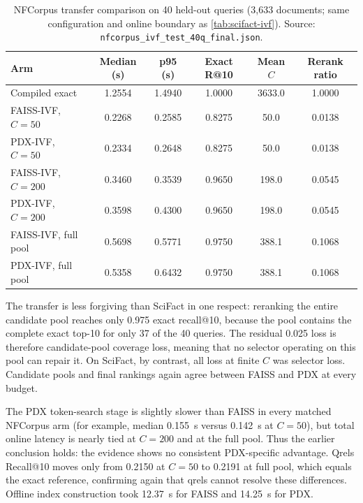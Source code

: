 \begin{table}[tb]
  \centering
  \caption{NFCorpus transfer comparison on 40 held-out queries
    (3{,}633 documents; same configuration and online boundary as
    \cref{tab:scifact-ivf}).
    Source: \texttt{nfcorpus\_ivf\_test\_40q\_final.json}.}
  \label{tab:nfcorpus-ivf}
  \footnotesize
  \begin{tabular}{@{}l S[table-format=1.4] S[table-format=1.4] S[table-format=1.4] S[table-format=4.1] S[table-format=1.4]@{}}
    \toprule
    Arm & {Median (\si{\second})} & {p95 (\si{\second})} & {Exact R@10} & {Mean $C$} & {Rerank ratio} \\
    \midrule
    Compiled exact      & 1.2554 & 1.4940 & 1.0000 & 3633.0 & 1.0000 \\
    \midrule
    FAISS-IVF, $C{=}50$  & 0.2268 & 0.2585 & 0.8275 &   50.0 & 0.0138 \\
    PDX-IVF,   $C{=}50$  & 0.2334 & 0.2648 & 0.8275 &   50.0 & 0.0138 \\
    FAISS-IVF, $C{=}200$ & 0.3460 & 0.3539 & 0.9650 &  198.0 & 0.0545 \\
    PDX-IVF,   $C{=}200$ & 0.3598 & 0.4300 & 0.9650 &  198.0 & 0.0545 \\
    FAISS-IVF, full pool & 0.5698 & 0.5771 & 0.9750 &  388.1 & 0.1068 \\
    PDX-IVF,   full pool & 0.5358 & 0.6432 & 0.9750 &  388.1 & 0.1068 \\
    \bottomrule
  \end{tabular}
\end{table}

The transfer is less forgiving than SciFact in one respect: reranking the 
entire candidate pool reaches only 0.975 exact recall@10, because the pool 
contains the complete exact top-10 for only 37 of the 40 queries. The residual 
0.025 loss is therefore candidate-pool coverage loss, meaning that no selector 
operating on this pool can repair it. On SciFact, by contrast, all loss at 
finite $C$ was selector loss. Candidate pools and final rankings again agree 
between FAISS and PDX at every budget.

The PDX token-search stage is slightly slower than FAISS in every matched 
NFCorpus arm (for example, median \SI{0.155}{\second} versus \SI{0.142}{\second} at 
$C = 50$), but total online latency is nearly tied at $C = 200$ and at the 
full pool. Thus the earlier conclusion holds: the evidence shows no consistent 
PDX-specific advantage. Qrels Recall@10 moves only from 0.2150 at $C=50$ to 
0.2191 at full pool, which equals the exact reference, confirming again that 
qrels cannot resolve these differences. Offline index construction took 
\SI{12.37}{\second} for FAISS and \SI{14.25}{\second} for PDX.